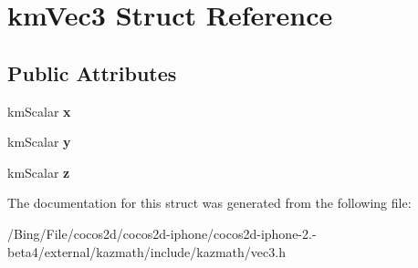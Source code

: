 \hypertarget{structkm_vec3}{\section{km\-Vec3 Struct Reference}
\label{structkm_vec3}
}
\subsection*{Public Attributes}
\begin{DoxyCompactItemize}
\item 
\hypertarget{structkm_vec3_a800c3571e905feddc73453c652be72fb}{km\-Scalar {\bfseries x}}\label{structkm_vec3_a800c3571e905feddc73453c652be72fb}

\item 
\hypertarget{structkm_vec3_a45906c9d76262c5a9dd1c3774ee937eb}{km\-Scalar {\bfseries y}}\label{structkm_vec3_a45906c9d76262c5a9dd1c3774ee937eb}

\item 
\hypertarget{structkm_vec3_a539514eaeee81aaeee3bb90f7a1581af}{km\-Scalar {\bfseries z}}\label{structkm_vec3_a539514eaeee81aaeee3bb90f7a1581af}

\end{DoxyCompactItemize}


The documentation for this struct was generated from the following file\-:\begin{DoxyCompactItemize}
\item 
/\-Bing/\-File/cocos2d/cocos2d-\/iphone/cocos2d-\/iphone-\/2.-\/beta4/external/kazmath/include/kazmath/vec3.\-h\end{DoxyCompactItemize}
